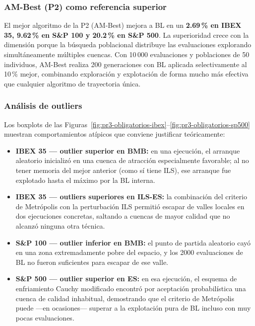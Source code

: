 \subsubsection*{AM-Best (P2) como referencia superior}

El mejor algoritmo de la P2 (AM-Best) mejora a BL en un \textbf{2.69\,\% en IBEX 35,
9.62\,\% en S\&P 100 y 20.2\,\% en S\&P 500}. La superioridad crece con la dimensión porque
la búsqueda poblacional distribuye las evaluaciones explorando simultáneamente múltiples cuencas.
Con 10\,000 evaluaciones y poblaciones de 50 individuos, AM-Best realiza 200 generaciones con
BL aplicada selectivamente al 10\,\% mejor, combinando exploración y explotación de forma mucho
más efectiva que cualquier algoritmo de trayectoria única.

\subsubsection*{Análisis de outliers}

Los boxplots de las Figuras~\ref{fig:pr3-obligatorios-ibex}--\ref{fig:pr3-obligatorios-sp500}
muestran comportamientos atípicos que conviene justificar teóricamente:
\begin{itemize}[noitemsep]
    \item \textbf{IBEX 35 — outlier superior en BMB:} en una ejecución, el arranque aleatorio
    inicializó en una cuenca de atracción especialmente favorable; al no tener memoria del mejor
    anterior (como sí tiene ILS), ese arranque fue explotado hasta el máximo por la BL interna.
    \item \textbf{IBEX 35 — outliers superiores en ILS-ES:} la combinación del criterio de
    Metrópolis con la perturbación ILS permitió escapar de valles locales en dos ejecuciones
    concretas, saltando a cuencas de mayor calidad que no alcanzó ninguna otra técnica.
    \item \textbf{S\&P 100 — outlier inferior en BMB:} el punto de partida aleatorio cayó en
    una zona extremadamente pobre del espacio, y los 2000 evaluaciones de BL no fueron suficientes
    para escapar de ese valle.
    \item \textbf{S\&P 500 — outlier superior en ES:} en esa ejecución, el esquema de enfriamiento
    Cauchy modificado encontró por aceptación probabilística una cuenca de calidad inhabitual,
    demostrando que el criterio de Metrópolis puede —en ocasiones— superar a la explotación pura
    de BL incluso con muy pocas evaluaciones.
\end{itemize}

